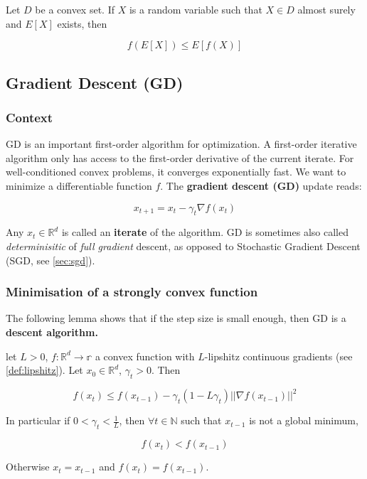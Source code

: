 \documentclass[
10pt, %
a4paper, %
oneside, %
headinclude,footinclude, %
BCOR5mm, %
]{scrartcl}
\begin{document}
Let $D$ be a convex set. If $X$ is a random variable such that $ X\in D$ almost surely and $ E[X]$ exists, then

\begin{equation*}
    f(E[X])\leq E[f(X)]
\end{equation*}

\subsection{\large\color{MidnightBlue}Gradient Descent (GD)}

\subsubsection{\large\color{Periwinkle}Context}

GD is an important first-order algorithm for optimization. A first-order iterative algorithm only has access to the first-order derivative of the current iterate. For well-conditioned convex problems, it converges exponentially fast. We want to minimize a differentiable function $f$. The \textbf{{gradient descent (GD)}}  update reads:

\begin{equation*}
    x_{t+1} = x_t - \gamma_t \nabla f(x_t)
\end{equation*}


Any $x_t\in \mathbb{R}^d$ is called an \textbf{{iterate}} of the algorithm. GD is sometimes also called \textit{{determinisitic}} of \textit{{full
gradient}} descent, as opposed to Stochastic Gradient Descent (SGD, see \ref{sec:sgd}).

\subsubsection{\large\color{Periwinkle}Minimisation of a strongly convex function}
\label{ssub:gd_strongly_convex}

The following lemma shows that if the step size is small enough, then GD is a \textbf{{descent algorithm.}} 

\begin{lemma}
    let $L>0$, $f: \mathbb{R}^d\rightarrow \mathbb{r} $ a convex function with $L$-lipshitz continuous gradients (see \ref{def:lipshitz}). Let $x_0\in \mathbb{R}^d$, $\gamma_t >0$. Then

    \begin{equation*}
	f(x_t)\leq f(x_{t-1})-\gamma_t (1-L\gamma_t) ||\nabla f(x_{t-1})||^2
    \end{equation*}

    In particular if $0<  \gamma_t < \frac{1}{L} $, then $ \forall t\in \mathbb{N} $ such that $ x_{t-1}$ is not a global minimum,

    \begin{equation*}
	f(x_t)<f(x_{t-1})
    \end{equation*}

    Otherwise $x_t = x_{t-1}$ and $f(x_t) = f(x_{t-1})$.
\end{lemma}
\end{document}
